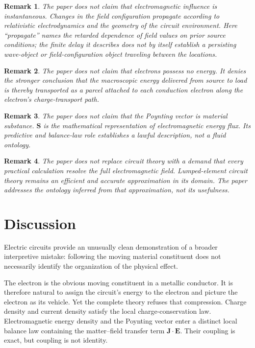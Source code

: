 \documentclass[12pt,onecolumn]{article}
\newtheorem{remark}{Remark}
\begin{document}
\begin{remark}
The paper does not claim that electromagnetic influence is instantaneous. Changes in the field configuration propagate according to relativistic electrodynamics and the geometry of the circuit environment. Here ``propagate'' names the retarded dependence of field values on prior source conditions; the finite delay it describes does not by itself establish a persisting wave-object or field-configuration object traveling between the locations.
\end{remark}

\begin{remark}
The paper does not claim that electrons possess no energy. It denies the stronger conclusion that the macroscopic energy delivered from source to load is thereby transported as a parcel attached to each conduction electron along the electron's charge-transport path.
\end{remark}

\begin{remark}
The paper does not claim that the Poynting vector is material substance. $\mathbf S$ is the mathematical representation of electromagnetic energy flux. Its predictive and balance-law role establishes a lawful description, not a fluid ontology.
\end{remark}

\begin{remark}
The paper does not replace circuit theory with a demand that every practical calculation resolve the full electromagnetic field. Lumped-element circuit theory remains an efficient and accurate approximation in its domain. The paper addresses the ontology inferred from that approximation, not its usefulness.
\end{remark}


\section{Discussion}

Electric circuits provide an unusually clean demonstration of a broader interpretive mistake: following the moving material constituent does not necessarily identify the organization of the physical effect.

The electron is the obvious moving constituent in a metallic conductor. It is therefore natural to assign the circuit's energy to the electron and picture the electron as its vehicle. Yet the complete theory refuses that compression. Charge density and current density satisfy the local charge-conservation law. Electromagnetic energy density and the Poynting vector enter a distinct local balance law containing the matter--field transfer term $\mathbf J\cdot\mathbf E$. Their coupling is exact, but coupling is not identity.
\end{document}
